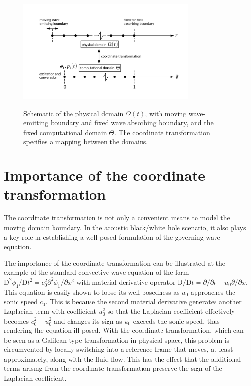 \begin{figure}
{\includegraphics[width=0.8\textwidth]{figures/domains.pdf}}
\caption{Schematic of the physical domain $\Omega\left(t\right)$, with moving wave-emitting boundary and fixed wave absorbing boundary, and the fixed computational domain $\Theta$. The coordinate transformation specifies a mapping between the domains.}
\label{fig:domains}
\end{figure}


\section{Importance of the coordinate transformation}
\label{sec:Importance of the coordinate transformation}

The coordinate transformation is not only a convenient means to model the moving domain boundary. In the acoustic black/white hole scenario, it also plays a key role in establishing a well-posed formulation of the governing wave equation.

The importance of the coordinate transformation can be illustrated at the example of the standard convective wave equation of the form $\mathrm{D}^2\phi_1/\mathrm{D}t^2 = c_0^2\partial^2\phi_1/\partial x^2$ with material derivative operator $\mathrm{D}/\mathrm{D}t = \partial/\partial t + u_0\partial/\partial x$. This equation is easily shown to loose its well-posedness as $u_0$ approaches the sonic speed $c_0$. This is because the second material derivative generates another Laplacian term with coefficient $u_0^2$ so that the Laplacian coefficient effectively becomes $c_0^2-u_0^2$ and changes its sign as $u_0$ exceeds the sonic speed, thus rendering the equation ill-posed. With the coordinate transformation, which can be seen as a Galilean-type transformation in physical space, this problem is circumvented by locally switching into a reference frame that moves, at least approximately, along with the fluid flow. This has the effect that the additional terms arising from the coordinate transformation preserve the sign of the Laplacian coefficient.
